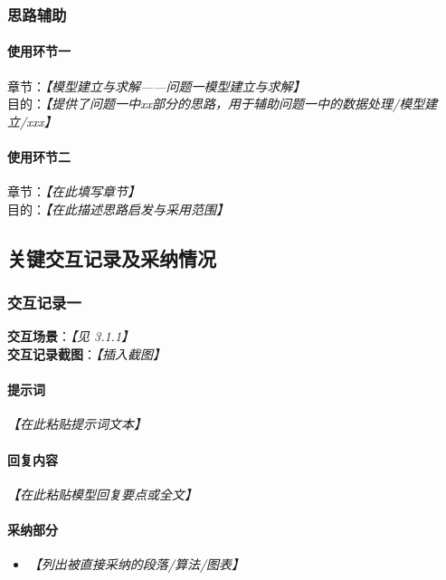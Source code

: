 \documentclass[12pt]{ctexart}
\newcommand{\ph}[1]{\textit{【#1】}}
\begin{document}
\subsubsection{思路辅助}
\paragraph{使用环节一}
章节：\ph{模型建立与求解——问题一模型建立与求解} \\
目的：\ph{提供了问题一中xx部分的思路，用于辅助问题一中的数据处理/模型建立/xxx}

\paragraph{使用环节二}
章节：\ph{在此填写章节} \\
目的：\ph{在此描述思路启发与采用范围}

\subsection{关键交互记录及采纳情况}
\subsubsection{交互记录一}
\textbf{交互场景}：\ph{见 3.1.1} \\[4pt]
\textbf{交互记录截图}：\ph{插入截图}

\paragraph{提示词}
\begin{flushleft}
\ph{在此粘贴提示词文本}
\end{flushleft}

\paragraph{回复内容}
\begin{flushleft}
\ph{在此粘贴模型回复要点或全文}
\end{flushleft}

\paragraph{采纳部分}
\begin{itemize}[leftmargin=1.5em]
  \item \ph{列出被直接采纳的段落/算法/图表}
\end{itemize}
\end{document}
